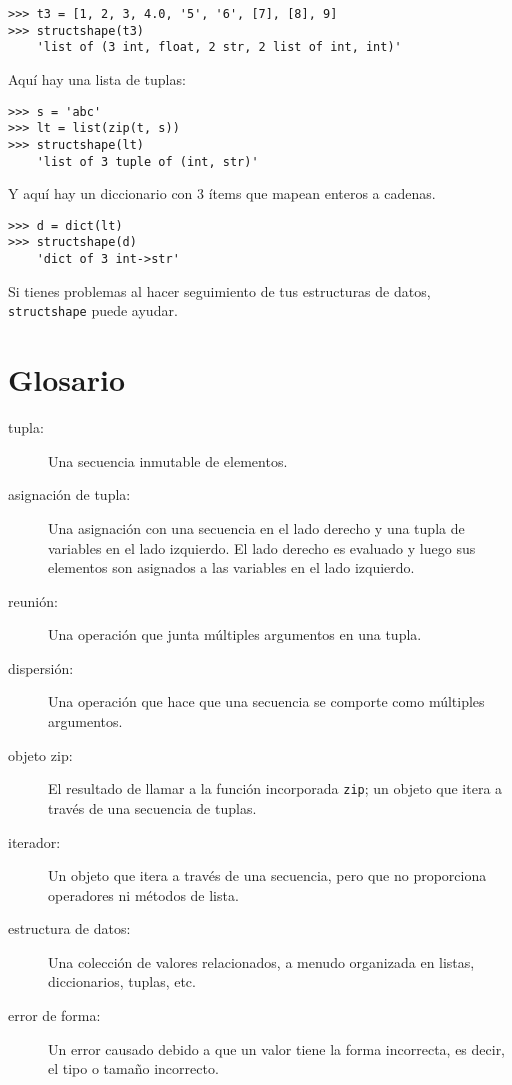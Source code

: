 \documentclass[10pt]{book}
\begin{document}
\begin{verbatim}
>>> t3 = [1, 2, 3, 4.0, '5', '6', [7], [8], 9]
>>> structshape(t3)
    'list of (3 int, float, 2 str, 2 list of int, int)'
\end{verbatim}
%
Aquí hay una lista de tuplas:

\begin{verbatim}
>>> s = 'abc'
>>> lt = list(zip(t, s))
>>> structshape(lt)
    'list of 3 tuple of (int, str)'
\end{verbatim}
%
Y aquí hay un diccionario con 3 ítems que mapean enteros a cadenas.

\begin{verbatim}
>>> d = dict(lt)
>>> structshape(d)
    'dict of 3 int->str'
\end{verbatim}
%
Si tienes problemas al hacer seguimiento de tus estructuras de datos,
{\tt structshape} puede ayudar.


\section{Glosario}

\begin{description}

\item[tupla:] Una secuencia inmutable de elementos.

\item[asignación de tupla:] Una asignación con una secuencia en el
lado derecho y una tupla de variables en el lado izquierdo.  El lado
derecho es evaluado y luego sus elementos son asignados a las
variables en el lado izquierdo.

\item[reunión:] Una operación que junta múltiples argumentos en una tupla.

\item[dispersión:] Una operación que hace que una secuencia se comporte como múltiples argumentos.

\item[objeto zip:] El resultado de llamar a la función incorporada {\tt zip};
un objeto que itera a través de una secuencia de tuplas.

\item[iterador:] Un objeto que itera a través de una secuencia, pero
que no proporciona operadores ni métodos de lista.

\item[estructura de datos:] Una colección de valores relacionados, a menudo
organizada en listas, diccionarios, tuplas, etc.

\item[error de forma:] Un error causado debido a que un valor tiene la forma
incorrecta, es decir, el tipo o tamaño incorrecto.

\end{description}
\end{document}

